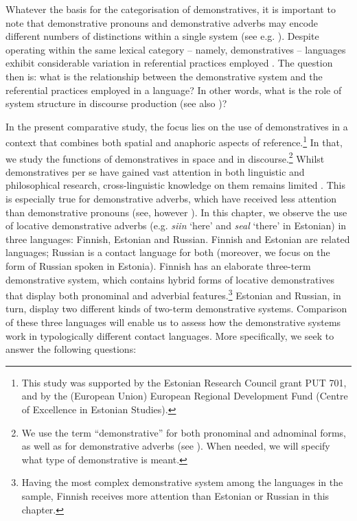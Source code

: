 \documentclass[output=paper,colorlinks,citecolor=brown]{langscibook}
\begin{document}
Whatever the basis for the categorisation of demonstratives, it is important to note that demonstrative pronouns and demonstrative adverbs may encode different numbers of distinctions within a single system (see e.g. \citealt{Hanks2011}). Despite operating within the same lexical category – namely, demonstratives – languages exhibit considerable variation in referential practices employed \citep{Hanks1990,Slobin1996}. The question then is: what is the relationship between the demonstrative system and the referential practices employed in a language? In other words, what is the role of system structure in discourse production (see also \citealt{MarchPattison2014})?

In the present comparative study, the focus lies on the use of demonstratives in a context that combines both spatial and anaphoric aspects of reference.\footnote{This study was supported by the Estonian Research Council grant PUT 701, and by the (European Union) European Regional Development Fund (Centre of Excellence in Estonian Studies).} In that, we study the functions of demonstratives in space and in discourse.\footnote{We use the term “demonstrative” for both pronominal and adnominal forms, as well as for demonstrative adverbs (see \citealt{Diessel1999Book}). When needed, we will specify what type of demonstrative is meant.} Whilst demonstratives per se have gained vast attention in both linguistic and philosophical research, cross-linguistic knowledge on them remains limited \citep[1]{Levinson2018}. This is especially true for demonstrative adverbs, which have received less attention than demonstrative pronouns (see, however \citealt{Laury1996,Laury1997,MaesRooij2007,Reile2015,Reile2016,ReileEtAl2019}). In this chapter, we observe the use of locative demonstrative adverbs (e.g. \textit{siin} ‘here’ and \textit{seal} ‘there’ in Estonian) in three languages: Finnish, Estonian and Russian. Finnish and Estonian are related languages; Russian is a contact language for both (moreover, we focus on the form of Russian spoken in Estonia). Finnish has an elaborate three-term demonstrative system, which contains hybrid forms of locative demonstratives that display both pronominal and adverbial features.\footnote{Having the most complex demonstrative system among the languages in the sample, Finnish receives more attention than Estonian or Russian in this chapter.}  Estonian and Russian, in turn, display two different kinds of two-term demonstrative systems. Comparison of these three languages will enable us to assess how the demonstrative systems work in typologically different contact languages. More specifically, we seek to answer the following questions:
\end{document}
